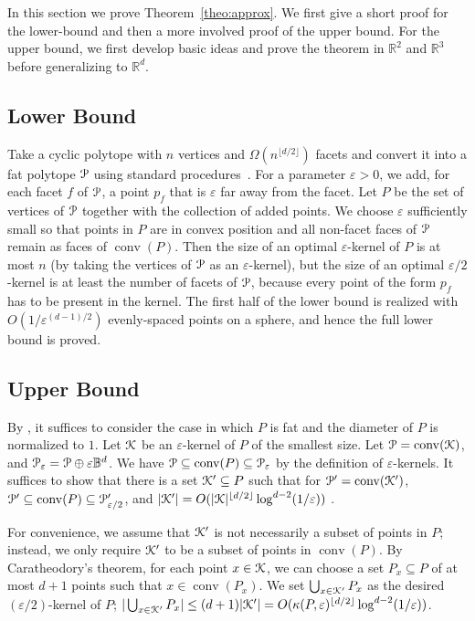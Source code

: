 \documentclass[11pt]{myclass}
\newcommand{\eps}{\varepsilon}
\renewcommand{\b}[1]{\ensuremath{\mathbb{#1}}}
\def\kernel{\EuScript{K}}
\newcommand{\conv}[1]{\mathop{\mathrm{conv}}(#1)}
\newcommand{\opt}[2]{\kappa(#1,#2)}
\newcommand{\polyt}{\EuScript{P}}
\newcommand{\ball}{\mathbb{B}}
\begin{document}
In this section we prove Theorem~\ref{theo:approx}. 
We first give a short proof for the lower-bound and then a more involved proof of the upper bound.  For the upper bound, we first develop basic ideas and prove the theorem in $\b{R}^2$ and $\b{R}^3$ before generalizing to $\b{R}^d$.

\subsection{Lower Bound}
Take a cyclic polytope with $n$ vertices and $\Omega(n^{\lfloor d/2 \rfloor})$ facets and convert it into a fat polytope $\polyt$ using standard procedures~\cite{AHV04}.  For a parameter $\eps>0$, we add, for each facet $f$ of $\polyt$, a point $p_f$ that is $\eps$ far away from the facet. Let $P$ be the set of vertices of $\polyt$ together with the collection of added points. We choose $\eps$ sufficiently small so that points in $P$ are in convex position and all non-facet faces of $\polyt$ remain as faces of $\conv{P}$. Then the size of an optimal $\eps$-kernel of $P$ is at most $n$ (by taking the vertices of $\polyt$ as an $\eps$-kernel), but the size of an optimal $\eps/2$-kernel is at least the number of facets of $\polyt$, because every point of the form $p_f$ has to be present in the kernel. 
The first half of the lower bound is realized with $O(1/\eps^{(d-1)/2})$ evenly-spaced points on a sphere, and hence the full lower bound is proved. 



\subsection{Upper Bound}
By \cite{AHV04}, it suffices to consider the case in which $P$ is fat and the diameter of $P$ is normalized to $1$.  
Let $\kernel$ be an $\eps$-kernel of $P$ of the smallest size.  
Let $\polyt=\conv{\kernel}$, and  $\polyt_\eps=\polyt \oplus \eps \ball^d$.  We have $\polyt \subseteq \conv{P} \subseteq \polyt_\eps$ by the definition of $\eps$-kernels. It suffices to show that there is a set $\kernel' \subseteq P$ such that for $\polyt'=\conv{\kernel'}$, $\polyt' \subseteq \conv{P} \subseteq \polyt'_{\eps/2}$, and $|\kernel'| =O(|\kernel| ^{\lfloor d/2 \rfloor}\log^{d-2} (1/\eps))$ \cite{AHV04}.

For convenience, we assume that $\kernel'$ is not necessarily a subset of points in $P$; instead, we only require $\kernel'$ to be a subset of points in $\conv{P}$. By Caratheodory's theorem, for each point $x \in \kernel$, we can choose a set $P_x \subseteq P$ of at most $d+1$ points such that $x \in \conv{P_x}$.  We set $\bigcup_{x \in \kernel'} P_x$ as the desired $(\eps/2)$-kernel of $P$; $|\bigcup_{x \in \kernel'} P_x| \leq (d+1)|\kernel^\prime| = O(\opt{P}{\eps}^{\lfloor d/2 \rfloor} \log^{d-2} (1/\eps))$.
\end{document}
